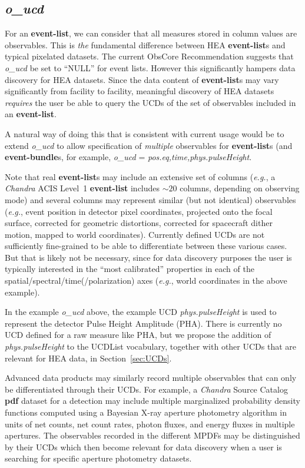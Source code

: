 \documentclass[11pt,a4paper]{ivoa}
\begin{document}
\subsection{{\em o\_ucd}}

For an {\bf event-list}, we can consider that all measures stored in column values are observables. This is {\em the\/} fundamental difference between \gls{HEA} {\bf event-list}s and typical pixelated datasets. The current ObsCore Recommendation suggests that {\em o\_ucd\/} be set to ``NULL'' for event lists. However this significantly hampers data discovery for \gls{HEA} datasets. Since the data content of {\bf event-list}s may vary significantly from facility to facility, meaningful discovery of \gls{HEA} datasets {\em requires\/} the user be able to query the UCDs of the set of observables included in an {\bf event-list}.

A natural way of doing this that is consistent with current usage would be to extend {\em o\_ucd\/} to allow specification of {\em multiple\/} observables for {\bf event-list}s (and {\bf event-bundle}s, for example, {\em o\_ucd\/} = {\em pos.eq,time,phys.pulseHeight\/}.

Note that real {\bf event-list}s may include an extensive set of columns ({\em e.g.\/}, a {\em Chandra\/} ACIS Level~1 {\bf event-list} includes $\sim\!20$ columns, depending on observing mode) and several columns may represent similar (but not identical) observables ({\em e.g.\/}, event position in detector pixel coordinates, projected onto the focal surface, corrected for geometric distortions, corrected for spacecraft dither motion, mapped to world coordinates).  Currently defined UCDs are not sufficiently fine-grained to be able to differentiate between these various cases. But that is likely not be necessary, since for data discovery purposes the user is typically interested in the ``most calibrated'' properties in each of the spatial/spectral/time(/polarization) axes ({\em e.g.\/}, world coordinates in the above example).

In the example {\em o\_ucd\/} above, the example UCD {\em phys.pulseHeight\/} is used to represent the detector Pulse Height Amplitude (PHA).  There is currently no UCD defined for a raw measure like PHA, but we propose the addition of {\em phys.pulseHeight\/} to the UCDList vocabulary, together with other UCDs that are relevant for \gls{HEA} data, in Section~\ref{sec:UCDs}.

Advanced data products may similarly record multiple observables that can only be differentiated through their UCDs. For example, a {\em Chandra\/} Source Catalog {\bf pdf} dataset for a detection may include multiple marginalized probability density functions computed using a Bayesian X-ray aperture photometry algorithm in units of net counts, net count rates, photon fluxes, and energy fluxes in multiple apertures.  The observables recorded in the different MPDFs may be distinguished by their UCDs which then become relevant for data discovery when a user is searching for specific aperture photometry datasets.
\end{document}
